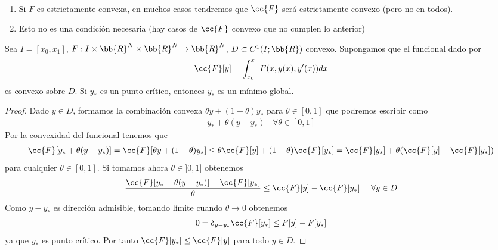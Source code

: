\begin{observacion}\
    \begin{enumerate}
        \item Si $F$ es estrictamente convexa, en muchos casos tendremos que $\cc{F}$ será estrictamente convexo (pero no en todos).
        \item Esto no es una condición necesaria (hay casos de $\cc{F}$ convexo que no cumplen lo anterior)
    \end{enumerate}
\end{observacion}

\begin{prop}
    Sea $I=[x_0,x_1]$, $F:I\times \bb{R}^N\times \bb{R}^N\to \bb{R}^N$, $D\subset C^1(I;\bb{R})$ convexo. Supongamos que el funcional dado por 
    \begin{gather*}
        \cc{F}[y] = \int_{x_0}^{x_1} F(x,y(x),y'(x)) dx
    \end{gather*}
    es convexo sobre $D$. Si $y_*$ es un punto crítico, entonces $y_*$ es un mínimo global.

    \begin{proof}
        Dado $y\in D$, formamos la combinación convexa $\theta y + (1-\theta) y_*$ para $\theta\in [0,1]$ que podremos escribir como 
        \begin{gather*}
            y_* + \theta(y-y_*) \ \ \ \ \forall \theta \in [0,1]
        \end{gather*}
        Por la convexidad del funcional tenemos que 
        \begin{gather*}
            \cc{F}[y_* + \theta(y-y_*)] = \cc{F}[\theta y + (1-\theta)y_*] \leq \theta \cc{F}[y] + (1-\theta)\cc{F}[y_*] = \cc{F}[y_*] + \theta(\cc{F}[y] - \cc{F}[y_*])
        \end{gather*}
        para cualquier $\theta \in [0,1]$. Si tomamos ahora $\theta \in ]0,1]$ obtenemos 
        \begin{gather*}
            \frac{\cc{F}[y_* + \theta(y-y_*)] - \cc{F}[y_*]}{\theta} \leq \cc{F}[y] - \cc{F}[y_*] \ \ \ \ \forall y\in D
        \end{gather*}
        Como $y-y_*$ es dirección admisible, tomando límite cuando $\theta\to 0$ obtenemos 
        \begin{gather*}
            0 = \delta_{y-y_*} \cc{F}[y_*] \leq F[y] - F[y_*]
        \end{gather*}
        ya que $y_*$ es punto crítico. Por tanto $\cc{F}[y_*]\leq \cc{F}[y]$ para todo $y\in D$.
    \end{proof}
\end{prop}

